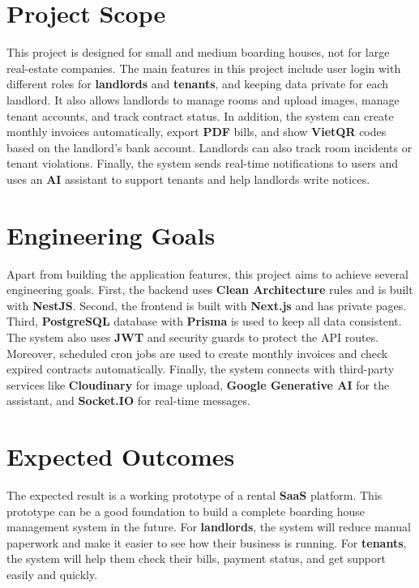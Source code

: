 \section{Project Scope}
This project is designed for small and medium boarding houses, not for large real-estate companies. The main features in this project include user login with different roles for \textbf{landlords} and \textbf{tenants}, and keeping data private for each landlord. It also allows landlords to manage rooms and upload images, manage tenant accounts, and track contract status. In addition, the system can create monthly invoices automatically, export \textbf{PDF} bills, and show \textbf{VietQR} codes based on the landlord's bank account. Landlords can also track room incidents or tenant violations. Finally, the system sends real-time notifications to users and uses an \textbf{AI} assistant to support tenants and help landlords write notices.

\section{Engineering Goals}
Apart from building the application features, this project aims to achieve several engineering goals. First, the backend uses \textbf{Clean Architecture} rules and is built with \textbf{NestJS}. Second, the frontend is built with \textbf{Next.js} and has private pages. Third, \textbf{PostgreSQL} database with \textbf{Prisma} is used to keep all data consistent. The system also uses \textbf{JWT} and security guards to protect the API routes. Moreover, scheduled cron jobs are used to create monthly invoices and check expired contracts automatically. Finally, the system connects with third-party services like \textbf{Cloudinary} for image upload, \textbf{Google Generative AI} for the assistant, and \textbf{Socket.IO} for real-time messages.

\section{Expected Outcomes}
The expected result is a working prototype of a rental \textbf{SaaS} platform. This prototype can be a good foundation to build a complete boarding house management system in the future. For \textbf{landlords}, the system will reduce manual paperwork and make it easier to see how their business is running. For \textbf{tenants}, the system will help them check their bills, payment status, and get support easily and quickly.
